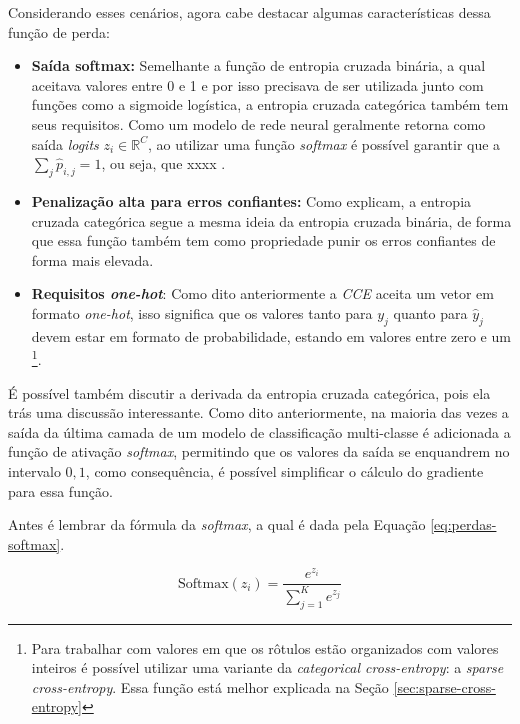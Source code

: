 Considerando esses cenários, agora cabe destacar algumas características dessa função de perda:

\begin{itemize}
    \item \textbf{Saída softmax:} Semelhante a função de entropia cruzada binária, a qual aceitava valores entre 0 e 1 e por isso precisava de ser utilizada junto com funções como a sigmoide logística, a entropia cruzada categórica também tem seus requisitos. Como um modelo de rede neural geralmente retorna como saída \textit{logits} $z_i \in \mathbb{R}^C$, ao utilizar uma função \textit{softmax} é possível garantir que a $\sum_{j} \hat{p}_{i,j} = 1$, ou seja, que xxxx \parencite{LossesArticle}.
    \item \textbf{Penalização alta para erros confiantes:} Como \textcite{LossesArticle} explicam, a entropia cruzada categórica segue a mesma ideia da entropia cruzada binária, de forma que essa função também tem como propriedade punir os erros confiantes de forma mais elevada.
    \item \textbf{Requisitos \textit{one-hot}}: Como dito anteriormente a \textit{CCE} aceita um vetor em formato \textit{one-hot}, isso significa que os valores tanto para $y_j$ quanto para $\hat{y}_j$ devem estar em formato de probabilidade, estando em valores entre zero e um \footnote{Para trabalhar com valores em que os rôtulos estão organizados com valores inteiros é possível utilizar uma variante da \textit{categorical cross-entropy}: a \textit{sparse cross-entropy}. Essa função está melhor explicada na Seção \ref{sec:sparse-cross-entropy}}.
\end{itemize}

É possível também discutir a derivada da entropia cruzada categórica, pois ela trás uma discussão interessante. Como dito anteriormente, na maioria das vezes a saída da última camada de um modelo de classificação multi-classe é adicionada a função de ativação \textit{softmax}, permitindo que os valores da saída se enquandrem no intervalo ${0, 1}$, como consequência, é possível simplificar o cálculo do gradiente para essa função. 

Antes é lembrar da fórmula da \textit{softmax}, a qual é dada pela Equação \ref{eq:perdas-softmax}.

\begin{equation}
    \text{Softmax}(z_i) = \frac{e^{z_i}}{\sum_{j=1}^{K} e^{z_j}}
    \label{eq:perdas-softmax}
\end{equation}

